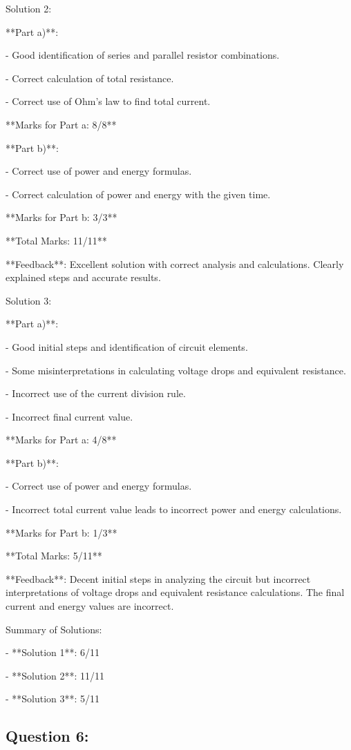 \documentclass[a4paper,11pt]{article}
\begin{document}
Solution 2:

**Part a)**:

- Good identification of series and parallel resistor combinations.

- Correct calculation of total resistance.

- Correct use of Ohm's law to find total current.

**Marks for Part a: 8/8**

**Part b)**:

- Correct use of power and energy formulas.

- Correct calculation of power and energy with the given time.

**Marks for Part b: 3/3**

**Total Marks: 11/11**

**Feedback**: Excellent solution with correct analysis and calculations. Clearly explained steps and accurate results.

Solution 3:

**Part a)**:

- Good initial steps and identification of circuit elements.

- Some misinterpretations in calculating voltage drops and equivalent resistance.

- Incorrect use of the current division rule.

- Incorrect final current value.

**Marks for Part a: 4/8**

**Part b)**:

- Correct use of power and energy formulas.

- Incorrect total current value leads to incorrect power and energy calculations.

**Marks for Part b: 1/3**

**Total Marks: 5/11**

**Feedback**: Decent initial steps in analyzing the circuit but incorrect interpretations of voltage drops and equivalent resistance calculations. The final current and energy values are incorrect.

Summary of Solutions:

- **Solution 1**: 6/11

- **Solution 2**: 11/11

- **Solution 3**: 5/11


\subsection*{Question 6:}
\end{document}

